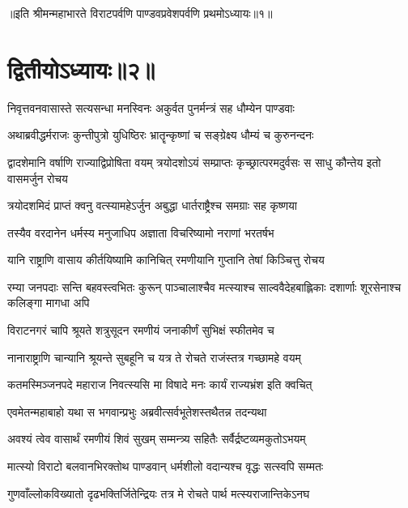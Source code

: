 ॥इति श्रीमन्महाभारते विराटपर्वणि पाण्डवप्रवेशपर्वणि प्रथमोऽध्यायः॥१॥

\chapter{द्वितीयोऽध्यायः॥२॥}

\twolineshloka
{निवृत्तवनवासास्ते सत्यसन्धा मनस्विनः}
{अकुर्वत पुनर्मन्त्रं सह धौम्येन पाण्डवाः}


\twolineshloka
{अथाब्रवीद्धर्मराजः कुन्तीपुत्रो युधिष्ठिरः}
{भ्रातॄन्कृष्णां च सङ्ग्रेक्ष्य धौम्यं च कुरुनन्दनः}


\threelineshloka
{द्वादशेमानि वर्षाणि राज्याद्विप्रोषिता वयम्}
{त्रयोदशोऽयं सम्प्राप्तः कृच्छ्रात्परमदुर्वसः}
{स साधु कौन्तेय इतो वासमर्जुन रोचय}


\twolineshloka
{त्रयोदशमिदं प्राप्तं क्वनु वत्स्यामहेऽर्जुन}
{अबुद्धा धार्तराष्ट्रैश्च समग्राः सह कृष्णया}




\twolineshloka
{तस्यैव वरदानेन धर्मस्य मनुजाधिप}
{अज्ञाता विचरिष्यामो नराणां भरतर्षभ}


\twolineshloka
{यानि राष्ट्राणि वासाय कीर्तयिष्यामि कानिचित्}
{रमणीयानि गुप्तानि तेषां किञ्चित्तु रोचय}


\threelineshloka
{रम्या जनपदाः सन्ति बहवस्त्वभितः कुरून्}
{पाञ्चालाश्चैव मत्स्याश्च साल्ववैदेहबाह्लिकाः}
{दशार्णाः शूरसेनाश्च कलिङ्गा मागधा अपि}


\twolineshloka
{विराटनगरं चापि श्रूयते शत्रुसूदन}
{रमणीयं जनाकीर्णं सुभिक्षं स्फीतमेव च}


\twolineshloka
{नानाराष्ट्राणि चान्यानि श्रूयन्ते सुबहूनि च}
{यत्र ते रोचते राजंस्तत्र गच्छामहे वयम्}


\twolineshloka
{कतमस्मिञ्जनपदे महाराज निवत्स्यसि}
{मा विषादे मनः कार्यं राज्यभ्रंश इति क्वचित्}




\twolineshloka
{एवमेतन्महाबाहो यथा स भगवान्प्रभुः}
{अब्रवीत्सर्वभूतेशस्तथैतन्न तदन्यथा}


\twolineshloka
{अवश्यं त्वेव वासार्थं रमणीयं शिवं सुखम्}
{सम्मन्त्र्य सहितैः सर्वैर्द्रष्टव्यमकुतोऽभयम्}


\twolineshloka
{मात्स्यो विराटो बलवानभिरक्तोथ पाण्डवान्}
{धर्मशीलो वदान्यश्च वृद्धः सत्स्वपि सम्मतः}


\twolineshloka
{गुणवाँल्लोकविख्यातो दृढभक्तिर्जितेन्द्रियः}
{तत्र मे रोचते पार्थ मत्स्यराजान्तिकेऽनघ}


